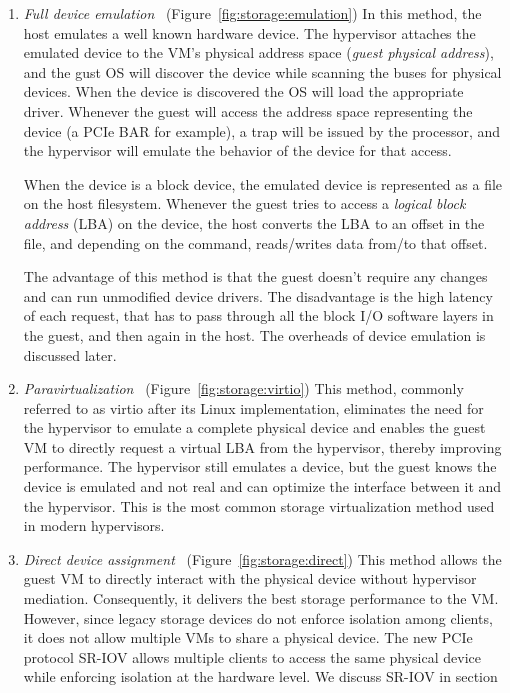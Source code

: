 \begin{enumerate}
\item
  \emph{Full device emulation}~\cite{sugerman2001virtualizing} (Figure~\ref{fig:storage:emulation})\quad
  In this method, the host emulates a well known hardware device.
  The hypervisor attaches the emulated device to the VM's physical address space (\emph{guest physical address}), and the gust OS will discover the device while scanning the buses for physical devices. When the device is discovered
  the OS will load the appropriate driver. Whenever the guest will access the address space representing the device (a PCIe BAR for example), a trap will be issued by the processor, and the hypervisor will emulate the
  behavior of the device for that access.

  When the device is a block device, the emulated device is represented as a file on the host filesystem. Whenever the guest tries to access a \emph{logical block address} (LBA) on the device, the host converts the LBA to an offset
  in the file, and depending on the command, reads/writes data from/to that offset.

  The advantage of this method is that the guest doesn't require any changes and can run unmodified device drivers.
  The disadvantage is the high latency of each request, that has to pass through all the block I/O software layers in the guest, and then again in the host. 
  The overheads of device emulation is discussed later.

  
\item
  \emph{Paravirtualization}~\cite{barham2003xen,russell2008virtio} (Figure~\ref{fig:storage:virtio})\quad
  This method, commonly referred to as virtio after its Linux implementation, eliminates the need for the hypervisor to emulate a complete physical device and enables the guest VM to directly request a virtual LBA from the
  hypervisor, thereby improving performance. The hypervisor still emulates a device, but the guest knows the device is emulated and not real and can optimize the interface between it and the hypervisor. 
  This is the most common storage virtualization method used in modern hypervisors.

\item
  \emph{Direct device assignment}~\cite{raj2007high} (Figure~\ref{fig:storage:direct})\quad
  This method allows the guest VM to directly interact with the physical device without hypervisor mediation. 
  Consequently, it delivers the best storage performance to the VM. However, since legacy storage devices do not enforce isolation among clients, it does not allow multiple VMs to share a physical device. The new PCIe protocol SR-IOV
  allows multiple clients to access the same physical device while enforcing isolation at the hardware level. We discuss SR-IOV in section  
  

\end{enumerate}


